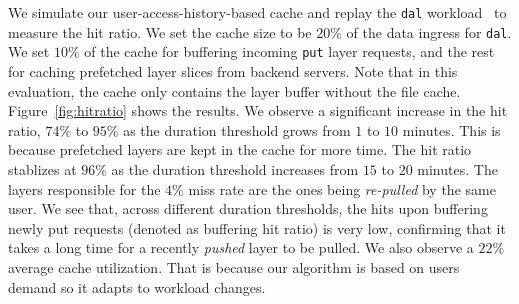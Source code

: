 We simulate our user-access-history-based cache and 
replay the \texttt{dal} workload~\cite{dockerworkload} to measure the hit ratio. We set the cache size to be $20$\% of the data ingress for \texttt{dal}. We set $10$\% of the cache for buffering incoming \texttt{put} layer requests, and 
the rest for caching prefetched layer slices from backend servers. 
Note that in this evaluation, the cache only contains the layer buffer without the file cache.
Figure~\ref{fig:hitratio} shows the results. We observe a significant increase in the hit ratio, $74$\% to $95$\% as the duration threshold grows from $1$ to $10$ minutes. This is because prefetched layers are kept in the cache for more time.
The hit ratio stablizes at $96$\% as the duration threshold increases from $15$ to $20$ minutes.
The layers responsible for the $4$\% miss rate are the ones being
\emph{re-pulled} by the same user.
We see that, across different duration thresholds, 
the hits upon buffering newly put requests (denoted as buffering hit ratio) is very low,
confirming that it takes a long time for a recently \emph{pushed} layer to be pulled.
We also observe a $22$\% average cache utilization. 
That is because our algorithm is based on users demand 
so it adapts to workload changes.
%

